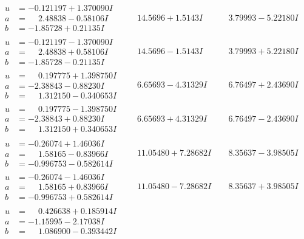 \documentclass[1p]{elsarticle_modified}
\theoremstyle{definition}
\begin{document}
$$\begin{array}{c|c|c}
\begin{aligned}
u &= -0.121197 + 1.370090 I \\
a &= \phantom{-}2.48838 - 0.58106 I \\
b &= -1.85728 + 0.21135 I\end{aligned}
 & \phantom{-}14.5696 + 1.5143 I & \phantom{-}3.79993 - 5.22180 I \\ \hline\begin{aligned}
u &= -0.121197 - 1.370090 I \\
a &= \phantom{-}2.48838 + 0.58106 I \\
b &= -1.85728 - 0.21135 I\end{aligned}
 & \phantom{-}14.5696 - 1.5143 I & \phantom{-}3.79993 + 5.22180 I \\ \hline\begin{aligned}
u &= \phantom{-}0.197775 + 1.398750 I \\
a &= -2.38843 - 0.88230 I \\
b &= \phantom{-}1.312150 - 0.340653 I\end{aligned}
 & \phantom{-}6.65693 - 4.31329 I & \phantom{-}6.76497 + 2.43690 I \\ \hline\begin{aligned}
u &= \phantom{-}0.197775 - 1.398750 I \\
a &= -2.38843 + 0.88230 I \\
b &= \phantom{-}1.312150 + 0.340653 I\end{aligned}
 & \phantom{-}6.65693 + 4.31329 I & \phantom{-}6.76497 - 2.43690 I \\ \hline\begin{aligned}
u &= -0.26074 + 1.46036 I \\
a &= \phantom{-}1.58165 - 0.83966 I \\
b &= -0.996753 - 0.582614 I\end{aligned}
 & \phantom{-}11.05480 + 7.28682 I & \phantom{-}8.35637 - 3.98505 I \\ \hline\begin{aligned}
u &= -0.26074 - 1.46036 I \\
a &= \phantom{-}1.58165 + 0.83966 I \\
b &= -0.996753 + 0.582614 I\end{aligned}
 & \phantom{-}11.05480 - 7.28682 I & \phantom{-}8.35637 + 3.98505 I \\ \hline\begin{aligned}
u &= \phantom{-}0.426638 + 0.185914 I \\
a &= -1.15995 - 2.17038 I \\
b &= \phantom{-}1.086900 - 0.393442 I\end{aligned}

\end{array}$$
\end{document}
